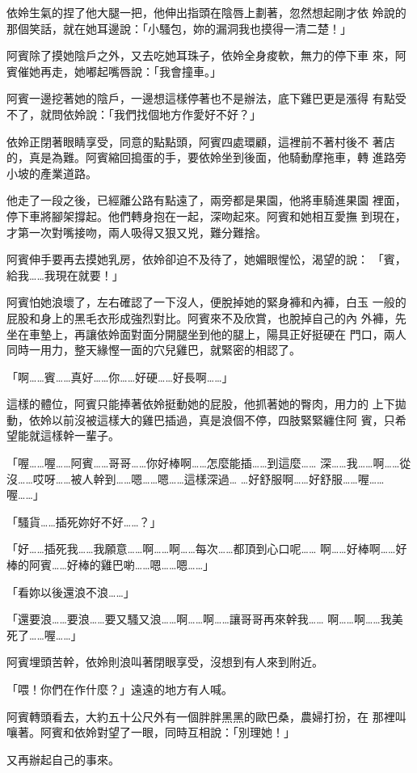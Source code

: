 依姈生氣的捏了他大腿一把，他伸出指頭在陰唇上劃著，忽然想起剛才依
姈說的那個笑話，就在她耳邊說：「小騷包，妳的漏洞我也摸得一清二楚！」

阿賓除了摸她陰戶之外，又去吃她耳珠子，依姈全身痠軟，無力的停下車
來，阿賓催她再走，她嘟起嘴唇說：「我會撞車。」

阿賓一邊挖著她的陰戶，一邊想這樣停著也不是辦法，底下雞巴更是漲得
有點受不了，就問依姈說：「我們找個地方作愛好不好？」

依姈正閉著眼睛享受，同意的點點頭，阿賓四處環顧，這裡前不著村後不
著店的，真是為難。阿賓縮回搗蛋的手，要依姈坐到後面，他騎動摩拖車，轉
進路旁小坡的產業道路。

他走了一段之後，已經離公路有點遠了，兩旁都是果園，他將車騎進果園
裡面，停下車將腳架撐起。他們轉身抱在一起，深吻起來。阿賓和她相互愛撫
到現在，才第一次對嘴接吻，兩人吸得又狠又兇，難分難捨。

阿賓伸手要再去摸她乳房，依姈卻迫不及待了，她媚眼惺忪，渴望的說：
「賓，給我……我現在就要！」

阿賓怕她浪壞了，左右確認了一下沒人，便脫掉她的緊身褲和內褲，白玉
一般的屁股和身上的黑毛衣形成強烈對比。阿賓來不及欣賞，也脫掉自己的內
外褲，先坐在車墊上，再讓依姈面對面分開腿坐到他的腿上，陽具正好挺硬在
門口，兩人同時一用力，整天緣慳一面的穴兒雞巴，就緊密的相認了。

「啊……賓……真好……你……好硬……好長啊……」

這樣的體位，阿賓只能捧著依姈挺動她的屁股，他抓著她的臀肉，用力的
上下拋動，依姈以前沒被這樣大的雞巴插過，真是浪個不停，四肢緊緊纏住阿
賓，只希望能就這樣幹一輩子。

「喔……喔……阿賓……哥哥……你好棒啊……怎麼能插……到這麼……
深……我……啊……從沒……哎呀……被人幹到……嗯……嗯……這樣深過…
…好舒服啊……好舒服……喔……喔……」

「騷貨……插死妳好不好……？」

「好……插死我……我願意……啊……啊……每次……都頂到心口呢……
啊……好棒啊……好棒的阿賓……好棒的雞巴喲……嗯……嗯……」

「看妳以後還浪不浪……」

「還要浪……要浪……要又騷又浪……啊……啊……讓哥哥再來幹我……
啊……啊……我美死了……喔……」

阿賓埋頭苦幹，依姈則浪叫著閉眼享受，沒想到有人來到附近。

「喂！你們在作什麼？」遠遠的地方有人喊。

阿賓轉頭看去，大約五十公尺外有一個胖胖黑黑的歐巴桑，農婦打扮，在
那裡叫嚷著。阿賓和依姈對望了一眼，同時互相說：「別理她！」

又再辦起自己的事來。

